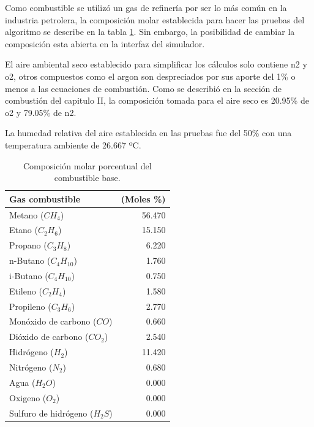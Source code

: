 \par Como combustible se utilizó un gas de refinería por ser lo más común en la industria petrolera, la composición molar establecida para hacer las pruebas del algoritmo se describe en la tabla \ref{tbl:combustible}. Sin embargo, la posibilidad de cambiar la composición esta abierta en la interfaz del simulador.

\par El aire ambiental seco establecido para simplificar los cálculos solo contiene \ac{n2} y \ac{o2}, otros compuestos como el \ac{argon} son despreciados por sus aporte del 1\% o menos a las ecuaciones de combustión. Como se describió en la sección de combustión del capitulo II, la composición tomada para el aire seco es 20.95\% de \ac{o2} y 79.05\% de \ac{n2}.

\par La humedad relativa del aire establecida en las pruebas fue del 50\% con una temperatura ambiente de 26.667 ºC.

\begin{table}
\begin{center}
\caption[Composición del combustible base]{Composición molar porcentual del combustible base.}
\label{tbl:combustible}
\begin{tabular}{l|r}
	Gas combustible					& (Moles \%) \\
	\hline
	Metano ($CH_4$)					& 56.470 \\
	Etano ($C_2H_6$)				& 15.150 \\
	Propano ($C_3H_8$)				& 6.220 \\
	n-Butano ($C_4H_{10}$)			& 1.760 \\
	i-Butano ($C_4H_{10}$)			& 0.750 \\
	Etileno ($C_2H_4$)				& 1.580 \\
	Propileno ($C_3H_6$)			& 2.770 \\
	Monóxido de carbono ($CO$)		& 0.660 \\
	Dióxido de carbono ($CO_2$)		& 2.540 \\
	Hidrógeno ($H_2$)				& 11.420 \\
	Nitrógeno ($N_2$)				& 0.680 \\
	Agua ($H_2O$)					& 0.000 \\
	Oxigeno ($O_2$)					& 0.000 \\
	Sulfuro de hidrógeno ($H_2S$)	& 0.000 \\
\end{tabular}
\end{center}
\end{table}

